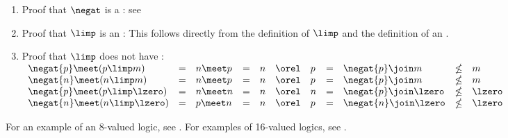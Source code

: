 \begin{proofns}
\begin{enumerate}
  \item Proof that $\negat$ is a : see 
  \item Proof that $\limp$ is an : 
        This follows directly from the definition of $\limp$ and the definition of an  .
  \item Proof that $\limp$ does not have : 
    \\$\begin{array}{lclclclclcl}
      \negat{p}\meet(p\limp m) &=& n\meet p &=& n &\orel& p &=& \negat{p}\join m &\nleq& m\\
      \negat{n}\meet(n\limp m) &=& n\meet p &=& n &\orel& p &=& \negat{p}\join m &\nleq& m\\
      \negat{p}\meet(p\limp\lzero) &=& n\meet n &=& n &\orel& n &=& \negat{p}\join \lzero &\nleq& \lzero\\
      \negat{n}\meet(n\limp\lzero) &=& p\meet n &=& n &\orel& p &=& \negat{n}\join \lzero &\nleq& \lzero
    \end{array}$
\end{enumerate}
\end{proofns}


For an example of an 8-valued logic, see .
For examples of 16-valued logics, see .





